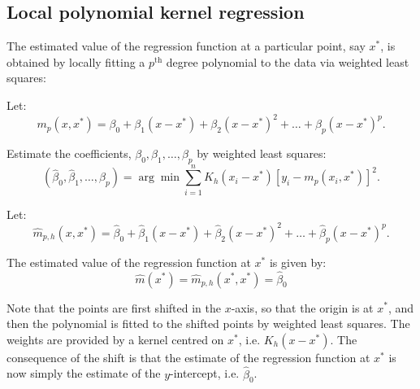 \subsection{Local polynomial kernel regression}
The estimated value of the regression function at a particular point, say $x^*$, is obtained by locally fitting a $p^{\textrm{th}}$ degree polynomial to the data via weighted least squares:
\begin{asparaenum}[(a)]
\item Let:
\begin{equation}
m_p(x,x^*)=\beta_0+\beta_1(x-x^*)+\beta_2(x-x^*)^2+\ldots+\beta_p(x-x^*)^p.
\end{equation}
\item Estimate the coefficients, $\beta_0,\beta_1,\ldots,\beta_p$ by weighted least squares:
\begin{equation}
(\hat{\beta}_0,\hat{\beta}_1,\ldots,\hat{\beta}_p)=\arg\min\sum^{n}_{i=1}K_h(x_i-x^*)[y_i-m_p(x_i,x^*)]^2.
\end{equation}
\item Let:
\begin{equation}
\hat{m}_{p,h}(x,x^*)=\hat{\beta}_0+\hat{\beta}_1(x-x^*)+\hat{\beta}_2(x-x^*)^2+\ldots+\hat{\beta}_p(x-x^*)^p.
\end{equation}
\item The estimated value of the regression function at $x^*$ is given by:
\begin{equation}
\hat{m}(x^*)=\hat{m}_{p,h}(x^*,x^*)=\hat{\beta}_0
\end{equation}
\end{asparaenum}
Note that the points are first shifted in the $x$-axis, so that the origin is at $x^*$, and then the polynomial is fitted to the shifted points by weighted least squares. The weights are provided by a kernel centred on $x^*$, i.e. $K_h(x-x^*)$. The consequence of the shift is that the estimate of the regression function at $x^*$ is now simply the estimate of the $y$-intercept, i.e. $\hat{\beta}_0$.

